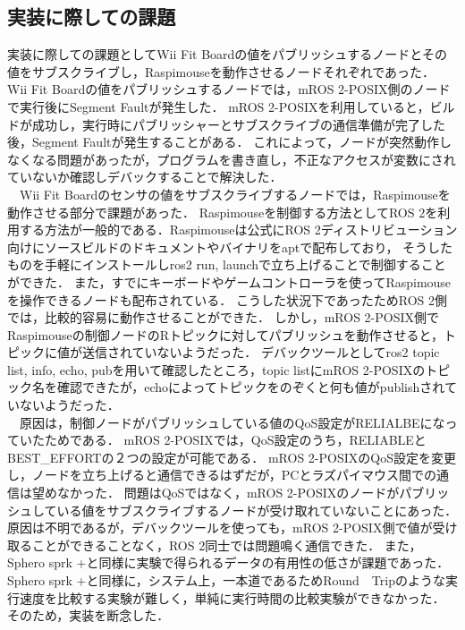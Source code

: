 \subsection{実装に際しての課題}
実装に際しての課題としてWii Fit Boardの値をパブリッシュするノードとその値をサブスクライブし，Raspimouseを動作させるノードそれぞれであった．
Wii Fit Boardの値をパブリッシュするノードでは，mROS 2-POSIX側のノードで実行後にSegment Faultが発生した．
mROS 2-POSIXを利用していると，ビルドが成功し，実行時にパブリッシャーとサブスクライブの通信準備が完了した後，Segment Faultが発生することがある．
これによって，ノードが突然動作しなくなる問題があったが，プログラムを書き直し，不正なアクセスが変数にされていないか確認しデバックすることで解決した．
\\　Wii Fit Boardのセンサの値をサブスクライブするノードでは，Raspimouseを動作させる部分で課題があった．
Raspimouseを制御する方法としてROS 2を利用する方法が一般的である．Raspimouseは公式にROS 2ディストリビューション向けにソースビルドのドキュメントやバイナリをaptで配布しており，
そうしたものを手軽にインストールしros2 run, launchで立ち上げることで制御することができた．
また，すでにキーボードやゲームコントローラを使ってRaspimouseを操作できるノードも配布されている．
こうした状況下であったためROS 2側では，比較的容易に動作させることができた．
しかし，mROS 2-POSIX側でRaspimouseの制御ノードのRトピックに対してパブリッシュを動作させると，トピックに値が送信されていないようだった．
デバックツールとしてros2 topic list, info, echo, pubを用いて確認したところ，topic listにmROS 2-POSIXのトピック名を確認できたが，echoによってトピックをのぞくと何も値がpublishされていないようだった．
\\　原因は，制御ノードがパブリッシュしている値のQoS設定がRELIALBEになっていたためである．
mROS 2-POSIXでは，QoS設定のうち，RELIABLEとBEST\_EFFORTの２つの設定が可能である．
mROS 2-POSIXのQoS設定を変更し，ノードを立ち上げると通信できるはずだが，PCとラズパイマウス間での通信は望めなかった．
問題はQoSではなく，mROS 2-POSIXのノードがパブリッシュしている値をサブスクライブするノードが受け取れていないことにあった．
原因は不明であるが，デバックツールを使っても，mROS 2-POSIX側で値が受け取ることができることなく，ROS 2同士では問題鳴く通信できた．
また，Sphero sprk +と同様に実験で得られるデータの有用性の低さが課題であった．
Sphero sprk +と同様に，システム上，一本道であるためRound　Tripのような実行速度を比較する実験が難しく，単純に実行時間の比較実験ができなかった．
そのため，実装を断念した．